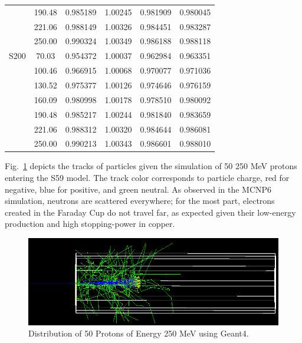 \documentclass{mc2015}
\begin{document}
\begin{table}[H]
\begin{tabular}{lccccc}
        & 190.48 & \num{0.985189} & \num{1.00245} & \num{0.981909} & \num{0.980045} \\
        & 221.06 & \num{0.988149} & \num{1.00326} & \num{0.984451} & \num{0.983287} \\
        & 250.00 & \num{0.990324} & \num{1.00349} & \num{0.986188} & \num{0.988118} \\
    \midrule
    S200 & 70.03 & \num{0.954372} & \num{1.00037} & \num{0.962984} & \num{0.963351} \\
        & 100.46 & \num{0.966915} & \num{1.00068} & \num{0.970077} & \num{0.971036} \\
        & 130.52 & \num{0.975377} & \num{1.00126} & \num{0.974646} & \num{0.976159} \\
        & 160.09 & \num{0.980998} & \num{1.00178} & \num{0.978510} & \num{0.980092} \\
        & 190.48 & \num{0.985217} & \num{1.00244} & \num{0.981840} & \num{0.983659} \\
        & 221.06 & \num{0.988312} & \num{1.00320} & \num{0.984644} & \num{0.986081} \\
        & 250.00 & \num{0.990213} & \num{1.00343} & \num{0.986601} & \num{0.988010} \\
    \bottomrule
  \end{tabular}
  \label{tab:geant4_data}
\end{table}

Fig.~\ref{fig:G4_dist} depicts the tracks of particles given the simulation of 50 250 MeV protons entering the S59 model.  The track color corresponds to particle charge, red for negative, blue for positive, and green neutral.  As observed in the MCNP6 simulation, neutrons are scattered everywhere; for the most part, electrons created in the Faraday Cup do not travel far, as expected given their low-energy production and high stopping-power in copper.

\begin{figure}[H]
  \centering
  \includegraphics[width=5in]{figures/fig_G4_dist.png}
  \caption{Distribution of 50 Protons of Energy 250 MeV using Geant4.}
  \label{fig:G4_dist}
\end{figure}
\end{document}
